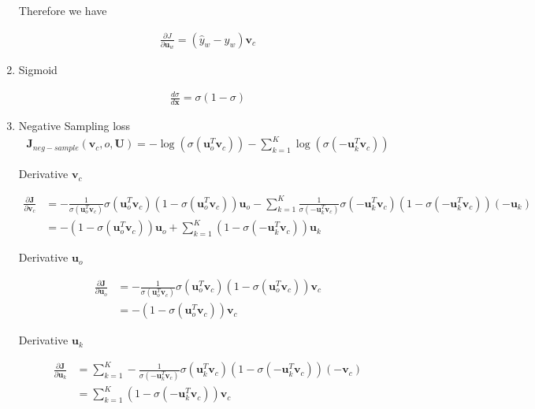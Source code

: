 \documentclass{article}
\begin{document}
\begin{enumerate}[label=(\alph*)]
	Therefore we have
	
	\begin{align}
	\frac{\partial J}{\partial \bm{u}_{w}} = (\hat{y}_{w}-y_{w}) \bm{v}_{c}
	\end{align}
	
	\item Sigmoid
	
	\begin{align}
	\frac{d \sigma}{d \bm{x}} = \sigma (1-\sigma)
	\end{align}
	
	\item Negative Sampling loss
	\begin{align}
	\bm{J}_{neg-sample}(\bm{v}_{c},o,\bm{U}) = - \log (\sigma(\bm{u}_{o}^{T} \bm{v}_{c})) - \sum_{k=1}^{K} \log (\sigma(-\bm{u}_{k}^{T} \bm{v}_{c}))
	\end{align}
	
	Derivative $\bm{v}_{c}$
	
	\begin{align}
	\frac{\partial \bm{J}}{\partial \bm{v}_{c}} &= - \frac{1}{\sigma(\bm{u}_{o}^{T} \bm{v}_{c})} \sigma(\bm{u}_{o}^{T} \bm{v}_{c}) (1-\sigma(\bm{u}_{o}^{T} \bm{v}_{c})) \bm{u}_{o} -\sum_{k=1}^{K}\frac{1}{\sigma(-\bm{u}_{k}^{T} \bm{v}_{c})} \sigma(-\bm{u}_{k}^{T} \bm{v}_{c}) (1-\sigma(-\bm{u}_{k}^{T} \bm{v}_{c})) (-\bm{u}_{k}) \\
	&= - (1-\sigma(\bm{u}_{o}^{T} \bm{v}_{c})) \bm{u}_{o} + \sum_{k=1}^{K} (1-\sigma(-\bm{u}_{k}^{T} \bm{v}_{c})) \bm{u}_{k}
	\end{align}
	
	Derivative $\bm{u}_{o}$
	
	\begin{align}
	\frac{\partial \bm{J}}{\partial \bm{u}_{o}} &= - \frac{1}{\sigma(\bm{u}_{o}^{T} \bm{v}_{c})} \sigma(\bm{u}_{o}^{T} \bm{v}_{c}) (1-\sigma(\bm{u}_{o}^{T} \bm{v}_{c})) \bm{v}_{c} \\
	&= - (1-\sigma(\bm{u}_{o}^{T} \bm{v}_{c})) \bm{v}_{c}
	\end{align}
	
	Derivative $\bm{u}_{k}$
	
	\begin{align}
	\frac{\partial \bm{J}}{\partial \bm{u}_{k}} &= \sum_{k=1}^{K}- \frac{1}{\sigma(-\bm{u}_{k}^{T} \bm{v}_{c})} \sigma(\bm{u}_{k}^{T} \bm{v}_{c}) (1-\sigma(-\bm{u}_{k}^{T} \bm{v}_{c})) (-\bm{v}_{c}) \\
	&= \sum_{k=1}^{K}(1-\sigma(-\bm{u}_{k}^{T} \bm{v}_{c})) \bm{v}_{c}
	\end{align}
	

\end{enumerate}
\end{document}
